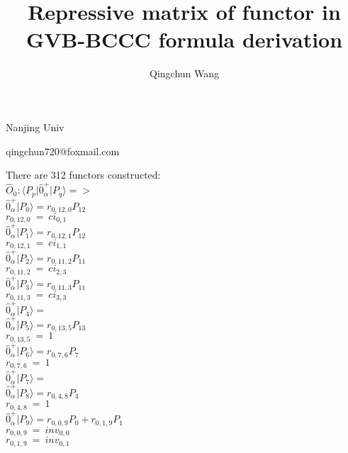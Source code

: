 \documentclass[14pt]{article}
\begin{document}
    \title{Repressive matrix of functor in GVB-BCCC formula derivation}
    \author{Qingchun Wang}
    \maketitle
    \centerline{Nanjing Univ}
    \centerline{qingchun720@foxmail.com}
    
    \linespread{2.0}\selectfont
    \thispagestyle{empty}
    
    \newpage
    \setlength{\parindent}{0pt}
    \setcounter{page}{1}
    
    There are 312 functors constructed: \\ 
    $\hat{O}_{0}:  \langle{P_p}\vert \hat{0}_{\alpha}^{+} \vert{P_q}\rangle => $ \\ 
    $ \hat{0}_{\alpha}^{+} \vert{P_{0}}\rangle = {r}_{0,12,0}P_{12} $ \\ 
    ${r}_{0,12,0}\ =\ {ci}_{0,1} $ \\ 
    $ \hat{0}_{\alpha}^{+} \vert{P_{1}}\rangle = {r}_{0,12,1}P_{12} $ \\ 
    ${r}_{0,12,1}\ =\ {ci}_{1,1} $ \\ 
    $ \hat{0}_{\alpha}^{+} \vert{P_{2}}\rangle = {r}_{0,11,2}P_{11} $ \\ 
    ${r}_{0,11,2}\ =\ {ci}_{2,3} $ \\ 
    $ \hat{0}_{\alpha}^{+} \vert{P_{3}}\rangle = {r}_{0,11,3}P_{11} $ \\ 
    ${r}_{0,11,3}\ =\ {ci}_{3,3} $ \\ 
    $ \hat{0}_{\alpha}^{+} \vert{P_{4}}\rangle =  $ \\ 
    $ \hat{0}_{\alpha}^{+} \vert{P_{5}}\rangle = {r}_{0,13,5}P_{13} $ \\ 
    ${r}_{0,13,5}\ =\ 1 $ \\ 
    $ \hat{0}_{\alpha}^{+} \vert{P_{6}}\rangle = {r}_{0,7,6}P_{7} $ \\ 
    ${r}_{0,7,6}\ =\ 1 $ \\ 
    $ \hat{0}_{\alpha}^{+} \vert{P_{7}}\rangle =  $ \\ 
    $ \hat{0}_{\alpha}^{+} \vert{P_{8}}\rangle = {r}_{0,4,8}P_{4} $ \\ 
    ${r}_{0,4,8}\ =\ 1 $ \\ 
    $ \hat{0}_{\alpha}^{+} \vert{P_{9}}\rangle = {r}_{0,0,9}P_{0}+{r}_{0,1,9}P_{1} $ \\ 
    ${r}_{0,0,9}\ =\ {inv}_{0,0} $ \\ 
    ${r}_{0,1,9}\ =\ {inv}_{0,1} $ \\ 
\end{document}
